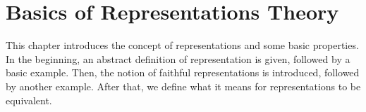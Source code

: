 \section{Basics of Representations Theory}

This chapter introduces the concept of representations and some basic properties.
In the beginning, an abstract definition of representation is given, followed by a basic example.
Then, the notion of faithful representations is introduced, followed by another example.
After that, we define what it means for representations to be equivalent.



